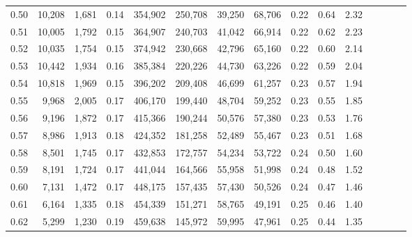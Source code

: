 \begin{tabular}{rrrcrrrrrrrrrrr}
0.50 &  10,208 &  1,681 &                                       0.14 &  354,902 &  250,708 &   39,250 &   68,706 &  0.22 &  0.64 &                         2.32 \\
0.51 &  10,005 &  1,792 &                                       0.15 &  364,907 &  240,703 &   41,042 &   66,914 &  0.22 &  0.62 &                         2.23 \\
0.52 &  10,035 &  1,754 &                                       0.15 &  374,942 &  230,668 &   42,796 &   65,160 &  0.22 &  0.60 &                         2.14 \\
0.53 &  10,442 &  1,934 &                                       0.16 &  385,384 &  220,226 &   44,730 &   63,226 &  0.22 &  0.59 &                         2.04 \\
0.54 &  10,818 &  1,969 &                                       0.15 &  396,202 &  209,408 &   46,699 &   61,257 &  0.23 &  0.57 &                         1.94 \\
0.55 &   9,968 &  2,005 &                                       0.17 &  406,170 &  199,440 &   48,704 &   59,252 &  0.23 &  0.55 &                         1.85 \\
0.56 &   9,196 &  1,872 &                                       0.17 &  415,366 &  190,244 &   50,576 &   57,380 &  0.23 &  0.53 &                         1.76 \\
0.57 &   8,986 &  1,913 &                                       0.18 &  424,352 &  181,258 &   52,489 &   55,467 &  0.23 &  0.51 &                         1.68 \\
0.58 &   8,501 &  1,745 &                                       0.17 &  432,853 &  172,757 &   54,234 &   53,722 &  0.24 &  0.50 &                         1.60 \\
0.59 &   8,191 &  1,724 &                                       0.17 &  441,044 &  164,566 &   55,958 &   51,998 &  0.24 &  0.48 &                         1.52 \\
0.60 &   7,131 &  1,472 &                                       0.17 &  448,175 &  157,435 &   57,430 &   50,526 &  0.24 &  0.47 &                         1.46 \\
0.61 &   6,164 &  1,335 &                                       0.18 &  454,339 &  151,271 &   58,765 &   49,191 &  0.25 &  0.46 &                         1.40 \\
0.62 &   5,299 &  1,230 &                                       0.19 &  459,638 &  145,972 &   59,995 &   47,961 &  0.25 &  0.44 &                         1.35 \\

\end{tabular}
